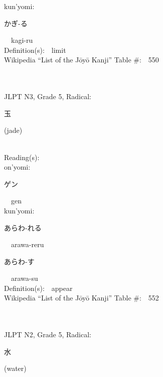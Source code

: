 \begin{multicols}{2}
{\hspace*{1em}}kun'yomi:\ \ \\
{\hspace*{2em}}{\begin{CJK}{UTF8}{min} かぎ-る \end{CJK}}\ \ kagi-ru\ \ \\
Definition(s):\ \ limit \\
Wikipedia ``List of the J\=oy\=o Kanji'' Table \#:\ \ 550 \\
\ \ \\
{\fontsize{34pt}{40pt}  }\ \ \\  %
{JLPT N3, Grade 5, Radical:\ \ {\begin{CJK}{UTF8}{min} 玉 \end{CJK}} (jade) } \\
Reading(s):\ \ \\
{\hspace*{1em}}on'yomi:\ \ \\
{\hspace*{2em}}{\begin{CJK}{UTF8}{min} ゲン \end{CJK}}\ \ gen\ \ \\
{\hspace*{1em}}kun'yomi:\ \ \\
{\hspace*{2em}}{\begin{CJK}{UTF8}{min} あらわ-れる \end{CJK}}\ \ arawa-reru\ \ \\
{\hspace*{2em}}{\begin{CJK}{UTF8}{min} あらわ-す \end{CJK}}\ \ arawa-su\ \ \\
Definition(s):\ \ appear \\
Wikipedia ``List of the J\=oy\=o Kanji'' Table \#:\ \ 552 \\
\ \ \\
{\fontsize{34pt}{40pt}  }\ \ \\  %
{JLPT N2, Grade 5, Radical:\ \ {\begin{CJK}{UTF8}{min} 水 \end{CJK}} (water) } \\

\end{multicols}
